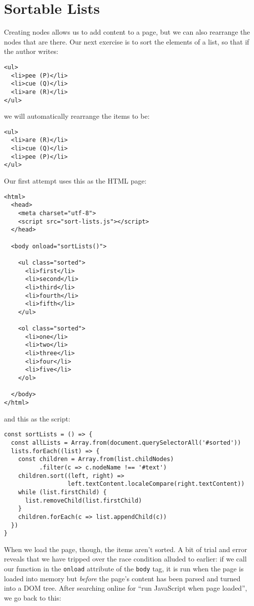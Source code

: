 \section{Sortable Lists}\label{s:pages-sort-list}

Creating nodes allows us to add content to a page,
but we can also rearrange the nodes that are there.
Our next exercise is to sort the elements of a list,
so that if the author writes:

\begin{verbatim}
<ul>
  <li>pee (P)</li>
  <li>cue (Q)</li>
  <li>are (R)</li>
</ul>
\end{verbatim}

\noindent
we will automatically rearrange the items to be:

\begin{verbatim}
<ul>
  <li>are (R)</li>
  <li>cue (Q)</li>
  <li>pee (P)</li>
</ul>
\end{verbatim}

Our first attempt uses this as the HTML page:

\begin{verbatim}
<html>
  <head>
    <meta charset="utf-8">
    <script src="sort-lists.js"></script>
  </head>

  <body onload="sortLists()">

    <ul class="sorted">
      <li>first</li>
      <li>second</li>
      <li>third</li>
      <li>fourth</li>
      <li>fifth</li>
    </ul>

    <ol class="sorted">
      <li>one</li>
      <li>two</li>
      <li>three</li>
      <li>four</li>
      <li>five</li>
    </ol>

  </body>
</html>
\end{verbatim}

\noindent
and this as the script:

\begin{verbatim}
const sortLists = () => {
  const allLists = Array.from(document.querySelectorAll('#sorted'))
  lists.forEach((list) => {
    const children = Array.from(list.childNodes)
          .filter(c => c.nodeName !== '#text')
    children.sort((left, right) =>
                  left.textContent.localeCompare(right.textContent))
    while (list.firstChild) {
      list.removeChild(list.firstChild)
    }
    children.forEach(c => list.appendChild(c))
  })
}
\end{verbatim}

When we load the page,
though,
the items aren't sorted.
A bit of trial and error reveals that we have tripped over the race condition alluded to earlier:
if we call our function in the \texttt{onload} attribute of the \texttt{body} tag,
it is run when the page is loaded into memory
but \emph{before} the page's content has been parsed and turned into a DOM tree.
After searching online for ``run JavaScript when page loaded'',
we go back to this:

